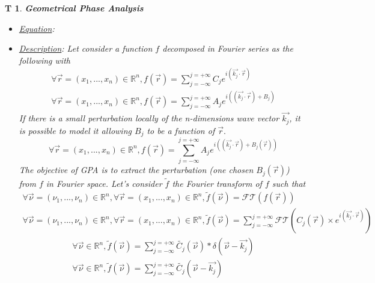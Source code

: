 \documentclass[12pt]{article}
\newtheorem{T}{T}
\begin{document}
\begin{T}
\label{T_2}
\noindent\colorbox{shadecolorT}{\normalfont \textbf{Geometrical Phase Analysis}}
\normalfont
\begin{itemize}
\item \underline{Equation}: 
\item \underline{Description}: Let consider a function $f$ decomposed in Fourier series as the following with 
\begin{equation}
\begin{gathered}
\forall \vec{r}=(x_1,...,x_n) \in \mathbb{R}^n, f(\vec{r})=\sum_{j=-\infty}^{j=+\infty}C_je^{i(\vec{k_j}\cdot\vec{r})} \\
\forall \vec{r}=(x_1,...,x_n) \in \mathbb{R}^n, f(\vec{r})=\sum_{j=-\infty}^{j=+\infty}A_je^{i((\vec{k_j}\cdot\vec{r})+B_j)}
\end{gathered}
\end{equation}
If there is a small perturbation locally of the n-dimensions wave vector $\vec{k_j}$, it is possible to model it allowing $B_j$ to be a function of $\vec{r}.$ 
\begin{equation}
\forall \vec{r}=(x_1,...,x_n) \in \mathbb{R}^n, f(\vec{r})=\sum_{j=-\infty}^{j=+\infty}A_je^{i((\vec{k_j}\cdot\vec{r})+B_j(\vec{r}))}
\end{equation}
The objective of GPA is to extract the perturbation (one chosen $B_j(\vec{r})$) from $f$ in Fourier space. Let's consider $\widetilde{f}$ the Fourier transform of $f$ such that
\begin{equation*}
\begin{gathered}
\forall \vec{\nu}=(\nu_1,...,\nu_n) \in \mathbb{R}^n, \forall \vec{r}=(x_1,...,x_n) \in \mathbb{R}^n, \widetilde{f}(\vec{\nu})=\mathcal{FT}(f(\vec{r})) \\
\forall \vec{\nu}=(\nu_1,...,\nu_n) \in \mathbb{R}^n, \forall \vec{r}=(x_1,...,x_n) \in \mathbb{R}^n, \widetilde{f}(\vec{\nu})=\sum_{j=-\infty}^{j=+\infty}\mathcal{FT}(C_j(\vec{r})\times e^{i(\vec{k_j}\cdot\vec{r})})
\end{gathered}
\end{equation*}
\begin{equation}
\begin{gathered}
\forall \vec{\nu}\in \mathbb{R}^n, \widetilde{f}(\vec{\nu})=\sum_{j=-\infty}^{j=+\infty}\widetilde{C_j}(\vec{\nu})\ast\delta(\vec{\nu}-\vec{k_j})\\
\forall \vec{\nu}\in \mathbb{R}^n, \widetilde{f}(\vec{\nu})=\sum_{j=-\infty}^{j=+\infty}\widetilde{C_j}(\vec{\nu}-\vec{k_j})

\end{gathered}
\end{equation}
\end{itemize}
\end{T}
\end{document}
